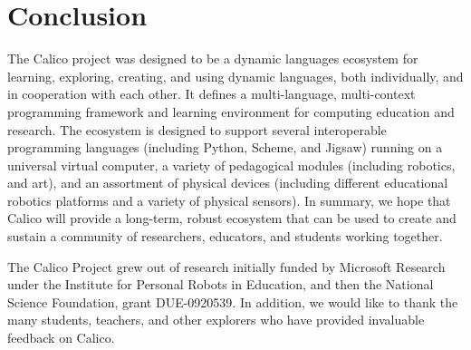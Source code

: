 \documentclass[preprint]{sigplanconf}
\begin{document}
\section{Conclusion}

The Calico project was designed to be a dynamic languages ecosystem
for learning, exploring, creating, and using dynamic languages, both
individually, and in cooperation with each other. It defines a
multi-language, multi-context programming framework and learning
environment for computing education and research. The ecosystem is
designed to support several interoperable programming languages
(including Python, Scheme, and Jigsaw) running on a universal virtual
computer, a variety of pedagogical modules (including robotics, and
art), and an assortment of physical devices (including different
educational robotics platforms and a variety of physical sensors). In
summary, we hope that Calico will provide a long-term, robust
ecosystem that can be used to create and sustain a community of
researchers, educators, and students working together.



\acks

The Calico Project grew out of research initially funded by Microsoft
Research under the Institute for Personal Robots in Education, and
then the National Science Foundation, grant DUE-0920539. In addition,
we would like to thank the many students, teachers, and other
explorers who have provided invaluable feedback on Calico.




\end{document}
